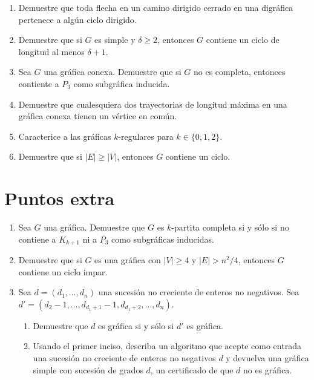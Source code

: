 \documentclass{article}
\begin{document}
\begin{enumerate}
\item Demuestre que toda flecha en un camino dirigido cerrado en una
  digr\'afica pertenece a alg\'un ciclo dirigido.

\item Demuestre que si $G$ es simple y $\delta \ge 2$, entonces $G$ contiene
  un ciclo de longitud al menos $\delta + 1$.

\item Sea $G$ una gr\'afica conexa.   Demuestre que si $G$ no es completa,
  entonces contiente a $P_3$ como subgr\'afica inducida.

\item Demuestre que cualesquiera dos trayectorias de longitud m\'axima en una
  gr\'afica conexa tienen un vértice en común.

\item Caracterice a las gr\'aficas $k$-regulares para $k \in \{ 0, 1, 2 \}$.

\item Demuestre que si $|E| \ge |V|$, entonces $G$ contiene un ciclo.
\end{enumerate}

\section*{Puntos extra}

\begin{enumerate}
\item Sea $G$ una gr\'afica.   Demuestre que $G$ es $k$-partita completa si y
  s\'olo si no contiene a $K_{k+1}$ ni a $\overline{P_3}$ como subgr\'aficas
  inducidas.

\item Demuestre que si $G$ es una gr\'afica con $|V| \ge 4$ y $|E| > n^2/4$,
  entonces $G$ contiene un ciclo impar.

\item Sea $d = (d_1, \dots, d_n)$ una sucesi\'on no creciente de enteros no
  negativos. Sea $d' = (d_2-1, \dots, d_{d_1+1}-1, d_{d_1+2}, \dots, d_n)$.
  \begin{enumerate}
  \item Demuestre que $d$ es gr\'afica si y s\'olo si $d'$ es gr\'afica.

  \item Usando el primer inciso, describa un algoritmo que acepte como
    entrada una sucesi\'on no creciente de enteros no negativos $d$ y
    devuelva una gr\'afica simple con sucesi\'on de grados $d$, un
    certificado de que $d$ no es gr\'afica.
  \end{enumerate}
\end{enumerate}
\end{document}
